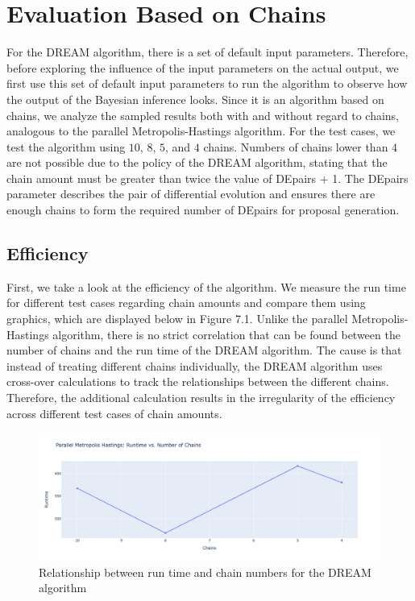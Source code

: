 \section{Evaluation Based on Chains}
For the DREAM algorithm, there is a set of default input parameters. Therefore, before exploring the influence of the input parameters on the actual output, we first use this set of default input parameters to run the algorithm to observe how the output of the Bayesian inference looks. Since it is an algorithm based on chains, we analyze the sampled results both with and without regard to chains, analogous to the parallel Metropolis-Hastings algorithm. For the test cases, we test the algorithm using $10$, $8$, $5$, and $4$ chains. Numbers of chains lower than $4$ are not possible due to the policy of the DREAM algorithm, stating that the chain amount must be greater than twice the value of DEpairs + 1. The DEpairs parameter describes the pair of differential evolution and ensures there are enough chains to form the required number of DEpairs for proposal generation.


\subsection{Efficiency}
First, we take a look at the efficiency of the algorithm. We measure the run time for different test cases regarding chain amounts and compare them using graphics, which are displayed below in Figure 7.1. Unlike the parallel Metropolis-Hastings algorithm, there is no strict correlation that can be found between the number of chains and the run time of the DREAM algorithm. The cause is that instead of treating different chains individually, the DREAM algorithm uses cross-over calculations to track the relationships between the different chains. Therefore, the additional calculation results in the irregularity of the efficiency across different test cases of chain amounts.

\begin{figure}[H]
    \centering
    \includegraphics[width=1\textwidth]{figures/dream/runtime.png}
    \captionsetup{width=.8\textwidth}
    \caption{Relationship between run time and chain numbers for the DREAM algorithm}
    \label{fig:enter-label}
\end{figure}
